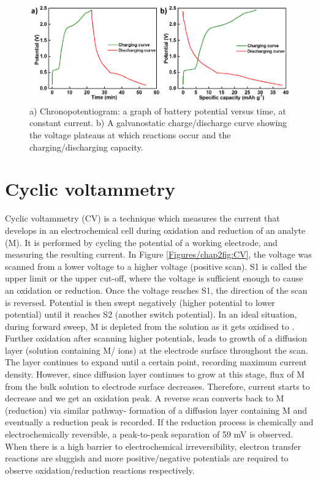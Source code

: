 \begin{figure}[th!]
\centering
\includegraphics[width=\textwidth]{Figures/chap2fig/ChrononCDC}
\caption{a) Chronopotentiogram: a graph of battery potential versus time, at constant current. b) A galvanostatic charge/discharge curve showing the voltage plateaus at which reactions occur and the charging/discharging capacity.}
\label{Figures/chap2fig:ChrononCDC}
\end{figure}

\section{Cyclic voltammetry}
Cyclic voltammetry (CV) is a technique which measures the current that develops in an electrochemical cell during oxidation and reduction of an analyte (M). It is performed by cycling the potential of a working electrode, and measuring the resulting current. In Figure \ref{Figures/chap2fig:CV}, the voltage was scanned from a lower voltage to a higher voltage (positive scan). S1 is called the upper limit or the upper cut-off, where the voltage is sufficient enough to cause an oxidation or reduction. Once the voltage reaches S1, the direction of the scan is reversed. Potential is then swept negatively (higher potential to lower potential) until it reaches S2 (another switch potential). In an ideal situation, during forward sweep, M is depleted from the solution as it gets oxidised to . Further oxidation after scanning higher potentials, leads to growth of a diffusion layer (solution containing M/ ions) at the electrode surface throughout the scan. The layer continues to expand until a certain point, recording maximum current density. However, since diffusion layer continues to grow at this stage, flux of M from the bulk solution to electrode surface decreases. Therefore, current starts to decrease and we get an oxidation peak. A reverse scan converts  back to M (reduction) via similar pathway- formation of a diffusion layer containing M and eventually a reduction peak is recorded. If the reduction process is chemically and electrochemically reversible, a peak-to-peak separation of 59 mV is observed. When there is a high barrier to electrochemical irreversibility, electron transfer reactions are sluggish and more positive/negative potentials are required to observe oxidation/reduction reactions respectively. 

